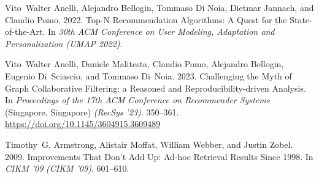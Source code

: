 \documentclass[sigconf,natbib=true,nonacm]{acmart}
\begin{document}
\begin{thebibliography}{62}


\ifx \showCODEN    \undefined {}     \fi
\ifx \showDOI      \undefined \def \showDOI       #1{#1}\fi
\ifx \showISBNx    \undefined \def \showISBNx     #1{\unskip}     \fi
\ifx \showISBNxiii \undefined \def \showISBNxiii  #1{\unskip}     \fi
\ifx \showISSN     \undefined \def \showISSN      #1{\unskip}     \fi
\ifx \showLCCN     \undefined \def \showLCCN      #1{\unskip}     \fi
\ifx \shownote     \undefined \def \shownote      #1{#1}          \fi
\ifx \showarticletitle \undefined \def \showarticletitle #1{#1}   \fi
\ifx \showURL      \undefined \def \showURL       {\relax}        \fi
\providecommand\bibfield[2]{#2}
\providecommand\bibinfo[2]{#2}
\providecommand\natexlab[1]{#1}
\providecommand\showeprint[2][]{arXiv:#2}

\bibfield{author}{\bibinfo{person}{Vito~Walter Anelli},
  \bibinfo{person}{Alejandro Bellogin}, \bibinfo{person}{Tommaso {Di Noia}},
  \bibinfo{person}{Dietmar Jannach}, {and} \bibinfo{person}{Claudio Pomo}.}
  \bibinfo{year}{2022}\natexlab{}.
\newblock \showarticletitle{Top-N Recommendation Algorithms: A Quest for the
  State-of-the-Art}. In \bibinfo{booktitle}{\emph{30th ACM Conference on User
  Modeling, Adaptation and Personalization (UMAP 2022)}}.
\newblock


\bibfield{author}{\bibinfo{person}{Vito~Walter Anelli},
  \bibinfo{person}{Daniele Malitesta}, \bibinfo{person}{Claudio Pomo},
  \bibinfo{person}{Alejandro Bellogin}, \bibinfo{person}{Eugenio Di~Sciascio},
  {and} \bibinfo{person}{Tommaso Di~Noia}.} \bibinfo{year}{2023}\natexlab{}.
\newblock \showarticletitle{Challenging the Myth of Graph Collaborative
  Filtering: a Reasoned and Reproducibility-driven Analysis}. In
  \bibinfo{booktitle}{\emph{Proceedings of the 17th ACM Conference on
  Recommender Systems}} (Singapore, Singapore) \emph{(\bibinfo{series}{RecSys
  '23})}. \bibinfo{pages}{350–361}.
\newblock
\urldef\tempurl%
\url{https://doi.org/10.1145/3604915.3609489}
\showDOI{\tempurl}


\bibfield{author}{\bibinfo{person}{Timothy~G. Armstrong},
  \bibinfo{person}{Alistair Moffat}, \bibinfo{person}{William Webber}, {and}
  \bibinfo{person}{Justin Zobel}.} \bibinfo{year}{2009}\natexlab{}.
\newblock \showarticletitle{Improvements That Don't Add Up: Ad-hoc Retrieval
  Results Since 1998}. In \bibinfo{booktitle}{\emph{CIKM '09}}
  \emph{(\bibinfo{series}{CIKM '09})}. \bibinfo{pages}{601--610}.
\newblock



\end{thebibliography}
\end{document}
